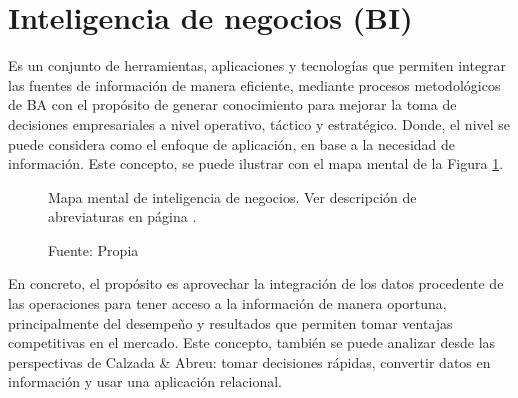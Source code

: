 \documentclass[12pt,jou]{apa7}
\begin{document}
\section{Inteligencia de negocios (BI)}
Es un conjunto de herramientas, aplicaciones y tecnologías que permiten integrar las fuentes de información de manera eficiente, mediante procesos metodológicos de BA con el propósito de generar conocimiento para mejorar la toma de decisiones empresariales a nivel operativo, táctico y estratégico. Donde, el nivel se puede considera como el enfoque de aplicación, en base a la necesidad de información. Este concepto, se puede ilustrar con el mapa mental de la Figura \ref{fig: BI}.
\begin{figure}[h]
\caption{Mapa mental de inteligencia de negocios. Ver descripción de abreviaturas en página \pageref{glosario}.}
\centering
{}
\caption*{ Fuente: Propia} \label{fig: BI}	
\end{figure}

En concreto, el propósito es aprovechar la integración de los datos procedente de las operaciones para tener acceso a la información de manera oportuna, principalmente del desempeño y resultados que permiten tomar ventajas competitivas en el mercado. Este concepto, también se puede analizar desde las perspectivas de Calzada \& Abreu: tomar decisiones rápidas, convertir datos en información y usar una aplicación relacional.
\end{document}
